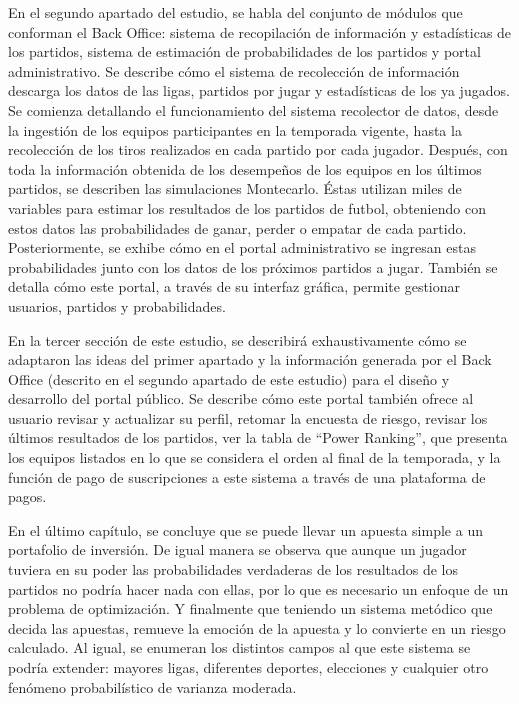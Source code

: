 En el segundo apartado del estudio, se habla del conjunto de módulos que conforman el Back Office: sistema de recopilación de información y estadísticas de los partidos, sistema de estimación de probabilidades de los partidos y portal administrativo. Se describe cómo el sistema de recolección de información descarga los datos de las ligas, partidos por jugar y estadísticas de los ya jugados. Se comienza detallando el funcionamiento del sistema recolector de datos, desde la ingestión de los equipos participantes en la temporada vigente, hasta la recolección de los tiros realizados en cada partido por cada jugador. Después, con toda la información obtenida de los desempeños de los equipos en los últimos partidos, se describen las simulaciones Montecarlo. Éstas utilizan miles de variables para estimar los resultados de los partidos de futbol, obteniendo con estos datos las probabilidades de ganar, perder o empatar de cada partido. Posteriormente, se exhibe cómo en el portal administrativo se ingresan estas probabilidades junto con los datos de los próximos partidos a jugar. También se detalla cómo este portal, a través de su interfaz gráfica, permite gestionar usuarios, partidos y probabilidades.


En la tercer sección de este estudio, se describirá exhaustivamente cómo se adaptaron las ideas del primer apartado y la información generada por el Back Office (descrito en el segundo apartado de este estudio) para el diseño y desarrollo del portal público. Se describe cómo este portal también ofrece al usuario revisar y actualizar su perfil, retomar la encuesta de riesgo, revisar los últimos resultados de los partidos, ver la tabla de ``Power Ranking'', que presenta los equipos listados en lo que se considera el orden al final de la temporada, y la función de pago de suscripciones a este sistema a través de una plataforma de pagos.


En el último capítulo, se concluye que se puede llevar un apuesta simple a un portafolio de inversión. De igual manera se observa que aunque un jugador tuviera en su poder las probabilidades verdaderas de los resultados de los partidos no podría hacer nada con ellas, por lo que es necesario un enfoque de un problema de optimización. Y finalmente que teniendo un sistema metódico que decida las apuestas, remueve la emoción de la apuesta y lo convierte en un riesgo calculado. Al igual, se enumeran los distintos campos al que este sistema se podría extender: mayores ligas, diferentes deportes, elecciones y cualquier otro fenómeno probabilístico de varianza moderada.

